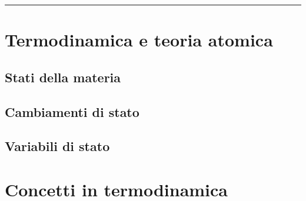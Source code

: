 \documentclass[letterpaper,10pt,italian]{jupyterBook}
\begin{document}
\bigskip\hrule\bigskip


\sphinxstepscope


\section{Termodinamica e teoria atomica}
\label{\detokenize{ch/thermodynamics/foundation-atomic-theory:termodinamica-e-teoria-atomica}}\label{\detokenize{ch/thermodynamics/foundation-atomic-theory:physics-hs-thermodynamics-foundation-atomic-theory}}\label{\detokenize{ch/thermodynamics/foundation-atomic-theory::doc}}

\subsection{Stati della materia}
\label{\detokenize{ch/thermodynamics/foundation-atomic-theory:stati-della-materia}}

\subsection{Cambiamenti di stato}
\label{\detokenize{ch/thermodynamics/foundation-atomic-theory:cambiamenti-di-stato}}

\subsection{Variabili di stato}
\label{\detokenize{ch/thermodynamics/foundation-atomic-theory:variabili-di-stato}}
\sphinxstepscope


\section{Concetti in termodinamica}
\label{\detokenize{ch/thermodynamics/foundation-vocabulary:concetti-in-termodinamica}}\label{\detokenize{ch/thermodynamics/foundation-vocabulary:physics-hs-thermodynamics-foundation-vocabulary}}\label{\detokenize{ch/thermodynamics/foundation-vocabulary::doc}}
\end{document}
